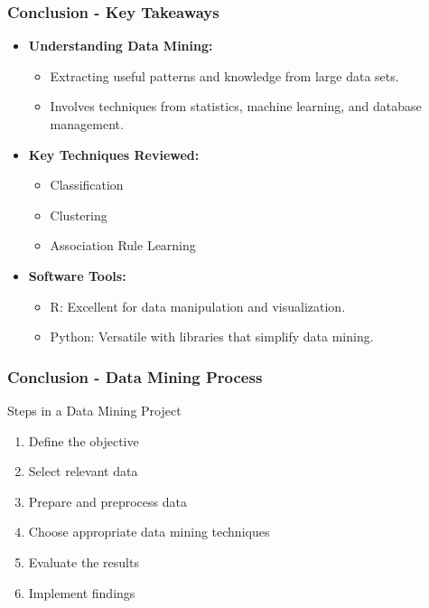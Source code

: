 \documentclass[aspectratio=169]{beamer}
\begin{document}
\begin{frame}[fragile]
    \frametitle{Conclusion - Key Takeaways}
    \begin{itemize}
        \item \textbf{Understanding Data Mining:} 
        \begin{itemize}
            \item Extracting useful patterns and knowledge from large data sets.
            \item Involves techniques from statistics, machine learning, and database management.
        \end{itemize}
        \item \textbf{Key Techniques Reviewed:}
        \begin{itemize}
            \item Classification
            \item Clustering
            \item Association Rule Learning
        \end{itemize}
        \item \textbf{Software Tools:}
        \begin{itemize}
            \item R: Excellent for data manipulation and visualization.
            \item Python: Versatile with libraries that simplify data mining.
        \end{itemize}
    \end{itemize}
\end{frame}

\begin{frame}[fragile]
    \frametitle{Conclusion - Data Mining Process}
    \begin{block}{Steps in a Data Mining Project}
        \begin{enumerate}
            \item Define the objective
            \item Select relevant data
            \item Prepare and preprocess data
            \item Choose appropriate data mining techniques
            \item Evaluate the results
            \item Implement findings
        \end{enumerate}
    \end{block}
\end{frame}
\end{document}
